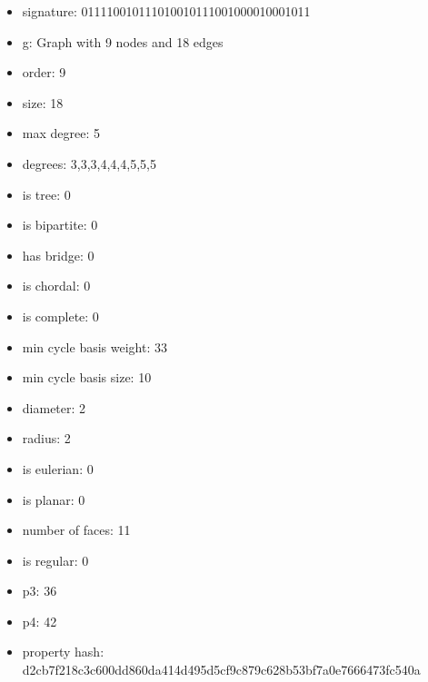 \newpage
\begin{figure}
\end{figure}
\begin{itemize}
\item signature: 011110010111010010111001000010001011
\item g: Graph with 9 nodes and 18 edges
\item order: 9
\item size: 18
\item max degree: 5
\item degrees: 3,3,3,4,4,4,5,5,5
\item is tree: 0
\item is bipartite: 0
\item has bridge: 0
\item is chordal: 0
\item is complete: 0
\item min cycle basis weight: 33
\item min cycle basis size: 10
\item diameter: 2
\item radius: 2
\item is eulerian: 0
\item is planar: 0
\item number of faces: 11
\item is regular: 0
\item p3: 36
\item p4: 42
\item property hash: d2cb7f218c3c600dd860da414d495d5cf9c879c628b53bf7a0e7666473fc540a
\end{itemize}
